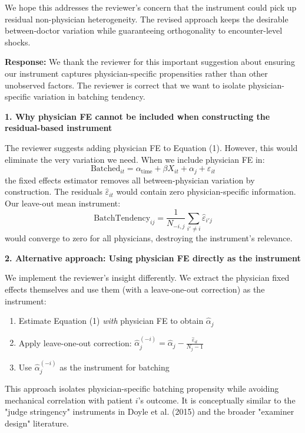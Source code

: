 \documentclass[11pt]{article}
\newcommand{\1}{\hbox{\rm 1\kern-.35em 1}}
\begin{document}
{{{{\vspace{0.8em}
\noindent We hope this addresses the reviewer’s concern that the instrument
could pick up residual non-physician heterogeneity.  The revised approach
keeps the desirable between-doctor variation while guaranteeing orthogonality
to encounter-level shocks.


\noindent\textbf{Response:} 
\color{blue}
We thank the reviewer for this important suggestion about ensuring our instrument captures physician-specific propensities rather than other unobserved factors. The reviewer is correct that we want to isolate physician-specific variation in batching tendency.

\bigskip
\noindent\textbf{1. Why physician FE cannot be included when constructing the residual-based instrument}

The reviewer suggests adding physician FE to Equation (1). However, this would eliminate the very variation we need. When we include physician FE in:
\begin{equation}
\text{Batched}_{it} = \alpha_{\text{time}} + \beta X_{it} + \alpha_j + \varepsilon_{it}
\end{equation}
the fixed effects estimator removes all between-physician variation by construction. The residuals $\hat{\varepsilon}_{it}$ would contain zero physician-specific information. Our leave-out mean instrument:
$$\text{BatchTendency}_{ij} = \frac{1}{N_{-i,j}}\sum_{i' \neq i} \hat{\varepsilon}_{i'j}$$
would converge to zero for all physicians, destroying the instrument's relevance.

\bigskip
\noindent\textbf{2. Alternative approach: Using physician FE directly as the instrument}

We implement the reviewer's insight differently. We extract the physician fixed effects themselves and use them (with a leave-one-out correction) as the instrument:

\begin{enumerate}
\item Estimate Equation (1) \textit{with} physician FE to obtain $\hat{\alpha}_j$
\item Apply leave-one-out correction: $\hat{\alpha}_j^{(-i)} = \hat{\alpha}_j - \frac{\hat{\varepsilon}_{it}}{N_j - 1}$
\item Use $\hat{\alpha}_j^{(-i)}$ as the instrument for batching
\end{enumerate}

This approach isolates physician-specific batching propensity while avoiding mechanical correlation with patient $i$'s outcome. It is conceptually similar to the "judge stringency" instruments in Doyle et al. (2015) and the broader "examiner design" literature.

}}}}
\end{document}
